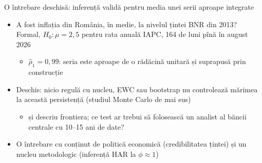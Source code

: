 \begin{frame}{O întrebare deschisă: inferență validă pentru media unei serii aproape integrate}
\itemsize{\small}
\begin{itemize}
    \item A fost inflația din România, în medie, la nivelul țintei BNR din 2013? Formal, $H_0: \mu = 2{,}5$ pentru rata anuală IAPC, 164 de luni pînă în august 2026
    \begin{itemize}
        \item $\hat\rho_1 = 0{,}99$: seria este aproape de o rădăcină unitară și suprapusă prin construcție
    \end{itemize}
    \item Deschis: nicio regulă cu nucleu, EWC sau bootstrap nu controlează mărimea la această persistență (studiul Monte Carlo de mai sus)
    \begin{itemize}
        \item {} și  descriu frontiera; ce test ar trebui să folosească un analist al băncii centrale cu 10--15 ani de date?
    \end{itemize}
    \item O întrebare cu conținut de politică economică (credibilitatea țintei) și un nucleu metodologic (inferență HAR la $\phi \approx 1$)
\end{itemize}
\end{frame}

